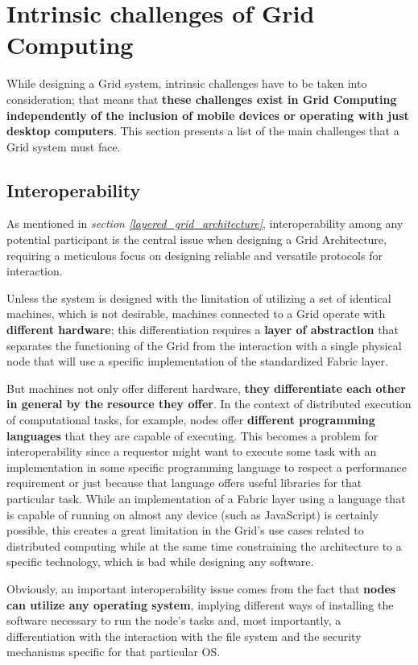 \section{Intrinsic challenges of Grid Computing}
While designing a Grid system, intrinsic challenges have to be taken into consideration; that means that \textbf{these challenges exist in Grid Computing independently of the inclusion of mobile devices or operating with just desktop computers}. This section presents a list of the main challenges that a Grid system must face.
\vspace{20mm}

\subsection{Interoperability}
As mentioned in \textit{section \ref{layered_grid_architecture}}, interoperability among any potential participant is the central issue when designing a Grid Architecture, requiring a meticulous focus on designing reliable and versatile protocols for interaction.

Unless the system is designed with the limitation of utilizing a set of identical machines, which is not desirable, machines connected to a Grid operate with \textbf{different hardware}; this differentiation requires a \textbf{layer of abstraction} that separates the functioning of the Grid from the interaction with a single physical node that will use a specific implementation of the standardized Fabric layer.

But machines not only offer different hardware, \textbf{they differentiate each other in general by the resource they offer}. In the context of distributed execution of computational tasks, for example, nodes offer \textbf{different programming languages} that they are capable of executing. This becomes a problem for interoperability since a requestor might want to execute some task with an implementation in some specific programming language to respect a performance requirement or just because that language offers useful libraries for that particular task. While an implementation of a Fabric layer using a language that is capable of running on almost any device (such as JavaScript) is certainly possible, this creates a great limitation in the Grid's use cases related to distributed computing while at the same time constraining the architecture to a specific technology, which is bad while designing any software.

Obviously, an important interoperability issue comes from the fact that \textbf{nodes can utilize any operating system}, implying different ways of installing the software necessary to run the node's tasks and, most importantly, a differentiation with the interaction with the file system and the security mechanisms specific for that particular OS.

